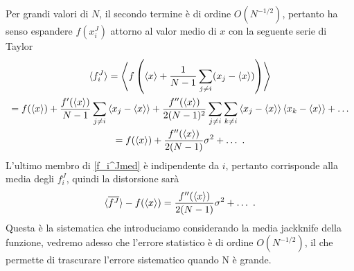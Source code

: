 \documentclass[LaM]{sapthesis}
\begin{document}
	Per grandi valori di $N$, il secondo termine è di ordine $O(N^{-1/2})$, pertanto ha senso espandere $f(x_i^J)$ attorno al valor medio di $x$ con la seguente serie di Taylor
	\begin{multline}\label{f_i^Jmed}
		\braket{f_i^J}=\left<{f\left(\braket{x}+\frac{1}{N-1}\sum_{j\ne i}(x_j-\braket{x})\right)}\right>\\
		=f(\braket{x})+\frac{f'(\braket{x})}{N-1}\sum_{j\ne i}\left<x_j-\braket{x}\right>+\frac{f''(\braket{x})}{2(N-1)^2}\sum_{j\ne i}\sum_{k\ne i}\left<x_j-\braket{x}\right>\left<x_k-\braket{x}\right>+\dots\\
		=f(\braket{x})+\frac{f''(\braket{x})}{2(N-1)}\sigma^2 +\dots \ .
	\end{multline}
	L'ultimo membro di \eqref{f_i^Jmed} è indipendente da $i$, pertanto corrisponde alla media degli $f_i^J$, quindi la distorsione sarà
	\begin{equation}
		\braket{\overline{f^J}}-f(\braket{x})=\frac{f''(\braket{x})}{2(N-1)}\sigma^2 +\dots \ .
	\end{equation}
	Questa è la sistematica che introduciamo considerando la media jackknife della funzione, vedremo adesso che l'errore statistico è di ordine $O(N^{-1/2})$, il che permette di trascurare l'errore sistematico quando N è grande.
	
\end{document}
